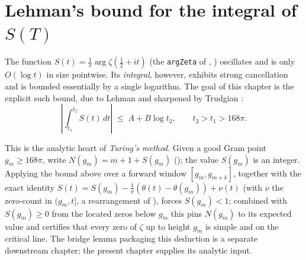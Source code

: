 %
%
%
%

\chapter{Lehman's bound for the integral of \texorpdfstring{$S(T)$}{S(T)}}
\label{cha:lehman_bound}

The function $S(t) = \tfrac1\pi\arg\zeta(\tfrac12+it)$ (the
\texttt{argZeta} of , )
oscillates and is only $O(\log t)$ in size pointwise. Its \emph{integral},
however, exhibits strong cancellation and is bounded essentially by a single
logarithm. The goal of this chapter is the explicit such bound, due to Lehman
\cite{Lehman1970} and sharpened by Trudgian \cite{TrudgianTuring}:
\[
  \left|\int_{t_1}^{t_2} S(t)\,dt\right| \;\le\; A + B\log t_2,
  \qquad t_2 > t_1 > 168\pi .
\]

This is the analytic heart of \emph{Turing's method}. Given a good Gram point
$g_m \ge 168\pi$, write $N(g_m) = m+1+S(g_m)$ (); the value
$S(g_m)$ is an integer. Applying the bound above over a forward window
$[g_m,g_{m+k}]$, together with the exact identity
$S(t) = S(g_m) - \tfrac1\pi(\theta(t)-\theta(g_m)) + \nu(t)$ (with $\nu$ the
zero-count in $(g_m,t]$, a rearrangement of ), forces
$S(g_m) < 1$; combined with $S(g_m)\ge 0$ from the located zeros below $g_m$ this
pins $N(g_m)$ to its expected value and certifies that every zero of $\zeta$ up
to height $g_m$ is simple and on the critical line. The bridge lemma packaging
this deduction is a separate downstream chapter; the present chapter supplies
its analytic input.


